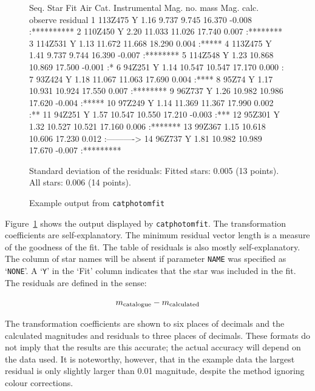 \documentclass[twoside,11pt,nolof]{starlink}
\begin{document}
\begin{enumerate}
\begin{figure}[htbp]
\begin{terminalv}
Seq.  Star         Fit Air      Cat.       Instrumental Mag.
no.                    mass     Mag.    calc.  observe residual
  1  113Z475        Y  1.16    9.737    9.745  16.370  -0.008 :**********
  2  110Z450        Y  2.20   11.033   11.026  17.740   0.007 :********
  3  114Z531        Y  1.13   11.672   11.668  18.290   0.004 :*****
  4  113Z475        Y  1.41    9.737    9.744  16.390  -0.007 :********
  5  114Z548        Y  1.23   10.868   10.869  17.500  -0.001 :*
  6  94Z251         Y  1.14   10.547   10.547  17.170   0.000 :
  7  93Z424         Y  1.18   11.067   11.063  17.690   0.004 :****
  8  95Z74          Y  1.17   10.931   10.924  17.550   0.007 :********
  9  96Z737         Y  1.26   10.982   10.986  17.620  -0.004 :*****
 10  97Z249         Y  1.14   11.369   11.367  17.990   0.002 :**
 11  94Z251         Y  1.57   10.547   10.550  17.210  -0.003 :***
 12  95Z301         Y  1.32   10.527   10.521  17.160   0.006 :*******
 13  99Z367            1.15   10.618   10.606  17.230   0.012 :---------->
 14  96Z737         Y  1.81   10.982   10.989  17.670  -0.007 :*********

Standard deviation of the residuals:
   Fitted stars:  0.005       (13 points).
   All stars:     0.006       (14 points).
\end{terminalv}

\begin{quote}
\caption{Example output from \texttt{catphotomfit}
\label{PHOTOFITOUT} }
\end{quote}

\end{figure}

   Figure~\ref{PHOTOFITOUT} shows the output displayed by \texttt{catphotomfit}.  The transformation coefficients are self-explanatory.
   The minimum residual vector length is a measure of the goodness of the
   fit.  The table of residuals is also mostly self-explanatory.  The column
   of star names will be absent if parameter \texttt{NAME} was specified as
   `\texttt{NONE}'.  A `\texttt{Y}' in the `Fit' column indicates that the star
   was included in the fit.  The residuals are defined in the sense:

  \begin{equation}
   m_{\rm catalogue} - m_{\rm calculated}
  \end{equation}

   The transformation coefficients are shown to six places of decimals
   and the calculated magnitudes and residuals to three places of
   decimals.  These formats do not imply that the results are this
   accurate; the actual accuracy will depend on the data used.  It is
   noteworthy, however, that in the example data the largest residual is
   only slightly larger than 0.01 magnitude, despite the method ignoring
   colour corrections.


\end{enumerate}
\end{document}
